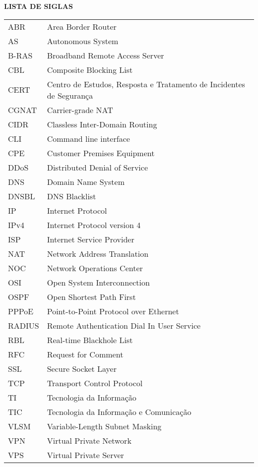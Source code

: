 \begin{center}
  \normalsize{\textbf{LISTA DE SIGLAS}}
\end{center}

\vspace{1mm}

\begin{center}
  \begin{tabular}{ m{3cm} m{10cm} }
    ABR & Area Border Router \\
    AS & Autonomous System \\
    B-RAS & Broadband Remote Access Server \\
    CBL & Composite Blocking List \\
    CERT &  Centro de Estudos, Resposta e Tratamento de Incidentes de Segurança \\
    CGNAT & Carrier-grade NAT \\
    CIDR & Classless Inter-Domain Routing \\
    CLI & Command line interface \\
    CPE & Customer Premises Equipment \\
    DDoS & Distributed Denial of Service \\
    DNS & Domain Name System \\
    DNSBL & DNS Blacklist \\
    IP & Internet Protocol \\ 
    IPv4 & Internet Protocol version 4 \\ 
    ISP & Internet Service Provider \\ 
    NAT & Network Address Translation \\
    NOC & Network Operations Center \\ 
    OSI & Open System Interconnection \\
    OSPF & Open Shortest Path First \\
    PPPoE & Point-to-Point Protocol over Ethernet \\
    RADIUS & Remote Authentication Dial In User Service \\
    RBL & Real-time Blackhole List \\
    RFC & Request for Comment \\
    SSL & Secure Socket Layer \\
    TCP & Transport Control Protocol \\ 
    TI & Tecnologia da Informação \\ 
    TIC & Tecnologia da Informação e Comunicação \\ 
    VLSM & Variable-Length Subnet Masking \\ 
    VPN & Virtual Private Network \\ 
    VPS & Virtual Private Server \\
  \end{tabular}
\end{center}
